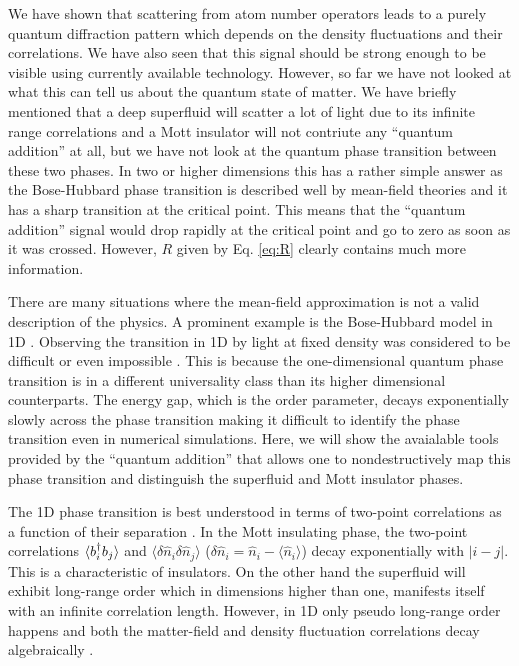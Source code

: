 We have shown that scattering from atom number operators leads to a
purely quantum diffraction pattern which depends on the density
fluctuations and their correlations. We have also seen that this
signal should be strong enough to be visible using currently available
technology. However, so far we have not looked at what this can tell
us about the quantum state of matter. We have briefly mentioned that a
deep superfluid will scatter a lot of light due to its infinite range
correlations and a Mott insulator will not contriute any ``quantum
addition'' at all, but we have not look at the quantum phase
transition between these two phases. In two or higher dimensions this
has a rather simple answer as the Bose-Hubbard phase transition is
described well by mean-field theories and it has a sharp transition at
the critical point. This means that the ``quantum addition'' signal
would drop rapidly at the critical point and go to zero as soon as it
was crossed. However, $R$ given by Eq. \eqref{eq:R} clearly contains
much more information.

There are many situations where the mean-field approximation is not a
valid description of the physics. A prominent example is the
Bose-Hubbard model in 1D \cite{cazalilla2011, ejima2011, kuhner2000,
  pino2012, pino2013}. Observing the transition in 1D by light at
fixed density was considered to be difficult \cite{rogers2014} or even
impossible \cite{roth2003}. This is because the one-dimensional
quantum phase transition is in a different universality class than its
higher dimensional counterparts. The energy gap, which is the order
parameter, decays exponentially slowly across the phase transition
making it difficult to identify the phase transition even in numerical
simulations. Here, we will show the avaialable tools provided by the
``quantum addition'' that allows one to nondestructively map this
phase transition and distinguish the superfluid and Mott insulator
phases.

The 1D phase transition is best understood in terms of two-point
correlations as a function of their separation \cite{giamarchi}. In
the Mott insulating phase, the two-point correlations $\langle b^\dagger_i
b_j \rangle$ and $\langle \delta \hat{n}_i \delta \hat{n}_j \rangle$
($\delta \hat{n}_i =\hat{n}_i-\langle \hat{n}_i\rangle$) decay
exponentially with $|i-j|$. This is a characteristic of insulators. On
the other hand the superfluid will exhibit long-range order which in
dimensions higher than one, manifests itself with an infinite
correlation length. However, in 1D only pseudo long-range order
happens and both the matter-field and density fluctuation correlations
decay algebraically \cite{giamarchi}.

